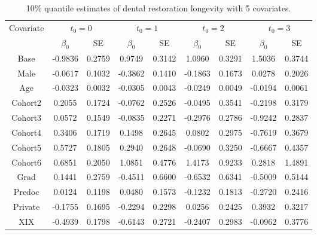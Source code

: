 \documentclass[12pt]{article}
\begin{document}
	\begin{table}[H]
		\caption{10\% quantile estimates of dental restoration longevity with 5 covariates.}
		\centering
		\begin{tabular}{|c|c|c|c|c|c|c|c|c|}
			\hline
			\multirow{2}{*}{Covariate} & \multicolumn{2}{c|}{$t_0=0$} & \multicolumn{2}{c|}{$t_0=1$} & \multicolumn{2}{c|}{$t_0=2$} & \multicolumn{2}{c|}{$t_0=3$}\\ 
			\cline{2-9}
			& $\beta_0$ & SE & $\beta_0$ & SE & $\beta_0$ & SE & $\beta_0$ & SE\\
			\hline\hline
			Base & -0.9836 & 0.2759 & 0.9749 & 0.3142 & 1.0960 & 0.3291 & 1.5036 & 0.3744 \\ 
			Male & -0.0617 & 0.1032 & -0.3862 & 0.1410 & -0.1863 & 0.1673 & 0.0278 & 0.2026 \\ 
			Age & -0.0323 & 0.0032 & -0.0305 & 0.0043 & -0.0249 & 0.0049 & -0.0194 & 0.0061 \\ 
			Cohort2 & 0.2055 & 0.1724 & -0.0762 & 0.2526 & -0.0495 & 0.3541 & -0.2198 & 0.3179 \\ 
			Cohort3 & 0.0572 & 0.1549 & -0.0835 & 0.2271 & -0.2976 & 0.2786 & -0.9242 & 0.2837 \\ 
			Cohort4 & 0.3406 & 0.1719 & 0.1498 & 0.2645 & 0.0802 & 0.2975 & -0.7619 & 0.3679 \\ 
			Cohort5 & 0.5727 & 0.1805 & 0.2940 & 0.2648 & -0.0690 & 0.3250 & -0.6667 & 0.4357 \\ 
			Cohort6 & 0.6851 & 0.2050 & 1.0851 & 0.4776 & 1.4173 & 0.9233 & 0.2818 & 1.4891 \\ 
			Grad & 0.1441 & 0.2759 & -0.4511 & 0.6600 & -0.6532 & 0.6341 & -0.5009 & 0.5144 \\ 
			Predoc & 0.0124 & 0.1198 & 0.0480 & 0.1573 & -0.1232 & 0.1813 & -0.2720 & 0.2416 \\ 
			Private & -0.1755 & 0.1695 & -0.2294 & 0.2298 & 0.0256 & 0.2425 & 0.3932 & 0.3217 \\ 
			XIX & -0.4939 & 0.1798 & -0.6143 & 0.2721 & -0.2407 & 0.2983 & -0.0962 & 0.3776 \\ 
			\hline
		\end{tabular}
	\end{table}
\end{document}
